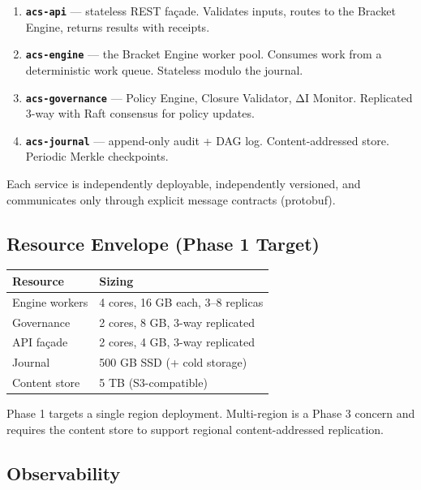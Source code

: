 \documentclass[11pt,a4paper]{article}
\providecommand{\tightlist}{\setlength{\itemsep}{0pt}\setlength{\parskip}{0pt}}
\begin{document}
\begin{enumerate}
\def\labelenumi{\arabic{enumi}.}
\tightlist
\item
  \textbf{\texttt{acs-api}} --- stateless REST façade. Validates inputs,
  routes to the Bracket Engine, returns results with receipts.
\item
  \textbf{\texttt{acs-engine}} --- the Bracket Engine worker pool.
  Consumes work from a deterministic work queue. Stateless modulo the
  journal.
\item
  \textbf{\texttt{acs-governance}} --- Policy Engine, Closure Validator,
  ΔI Monitor. Replicated 3-way with Raft consensus for policy updates.
\item
  \textbf{\texttt{acs-journal}} --- append-only audit + DAG log.
  Content-addressed store. Periodic Merkle checkpoints.
\end{enumerate}

Each service is independently deployable, independently versioned, and
communicates only through explicit message contracts (protobuf).

\hypertarget{resource-envelope-phase-1-target}{%
\subsection{Resource Envelope (Phase 1
Target)}\label{resource-envelope-phase-1-target}}

\setlength{\tabcolsep}{4pt}
\begin{longtable}[]{@{}ll@{}}
\toprule\noalign{}
Resource & Sizing \\
\midrule\noalign{}
\endhead
\bottomrule\noalign{}
\endlastfoot
Engine workers & 4 cores, 16 GB each, 3--8 replicas \\
Governance & 2 cores, 8 GB, 3-way replicated \\
API façade & 2 cores, 4 GB, 3-way replicated \\
Journal & 500 GB SSD (+ cold storage) \\
Content store & 5 TB (S3-compatible) \\
\end{longtable}

Phase 1 targets a single region deployment. Multi-region is a Phase 3
concern and requires the content store to support regional
content-addressed replication.

\hypertarget{observability}{%
\subsection{Observability}\label{observability}}
\end{document}
